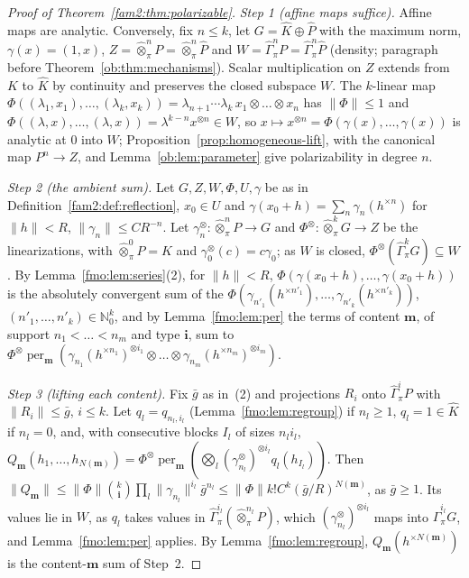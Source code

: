 \documentclass[11pt]{amsart}
\theoremstyle{definition}
\theoremstyle{remark}
\numberwithin{equation}{section}
\newcommand{\N}{\mathbb N}
\newcommand{\norm}[1]{\lVert #1\rVert}
\newcommand{\Kh}{\widehat K}
\theoremstyle{plain}
\theoremstyle{definition}
\theoremstyle{plain}
\newcommand{\hot}{\mathbin{\widehat\otimes}}
\newcommand{\hGamma}{\widehat\Gamma}
\begin{document}
\begin{proof}[Proof of Theorem~\ref{fam2:thm:polarizable}]
\emph{Step 1 (affine maps suffice).} Affine maps are analytic. Conversely, fix $n\le k$, let $G=\Kh\oplus\widehat P$ with
the maximum norm, $\gamma(x)=(1,x)$, $Z=\hot^n_\pi P=\hot^n_\pi\widehat P$ and $W=\hGamma^n_\pi P=\hGamma^n_\pi\widehat P$
(density; paragraph before Theorem~\ref{ob:thm:mechanisms}). Scalar multiplication on $Z$ extends from $K$ to $\Kh$
by continuity and preserves the closed subspace $W$. The $k$-linear map $\Phi((\lambda_1,x_1),\dots,(\lambda_k,x_k))=
\lambda_{n+1}\cdots\lambda_k\,x_1\otimes\dots\otimes x_n$ has $\norm\Phi\le1$ and $\Phi((\lambda,x),\dots,(\lambda,x))=
\lambda^{k-n}x^{\otimes n}\in W$, so
$x\mapsto x^{\otimes n}=\Phi(\gamma(x),\dots,\gamma(x))$ is analytic at $0$ into $W$; Proposition~\ref{prop:homogeneous-lift},
with the canonical map $P^n\to Z$, and Lemma~\ref{ob:lem:parameter} give polarizability in degree $n$.

\emph{Step 2 (the ambient sum).} Let $G,Z,W,\Phi,U,\gamma$ be as in Definition~\ref{fam2:def:reflection}, $x_0\in U$ and
$\gamma(x_0+h)=\sum_n\gamma_n(h^{\times n})$ for $\norm h<R$, $\norm{\gamma_n}\le CR^{-n}$. Let $\gamma^\otimes_n\colon
\hot^n_\pi P\to G$ and $\Phi^\otimes\colon\hot^k_\pi G\to Z$ be the linearizations, with $\hot^0_\pi P=\Kh$ and
$\gamma^\otimes_0(c)=c\gamma_0$; as $W$ is closed, $\Phi^\otimes(\hGamma^k_\pi G)\subseteq W$. By
Lemma~\ref{fmo:lem:series}(2), for $\norm h<R$, $\Phi(\gamma(x_0+h),\dots,\gamma(x_0+h))$ is the absolutely convergent sum of
the $\Phi(\gamma_{n'_1}(h^{\times n'_1}),\dots,\gamma_{n'_k}(h^{\times n'_k}))$, $(n'_1,\dots,n'_k)\in\N_0^k$, and by
Lemma~\ref{fmo:lem:per} the terms of content $\mathbf m$, of support $n_1<\dots<n_m$ and type $\mathbf i$, sum to
$\Phi^\otimes\operatorname{per}_{\mathbf m}(\gamma_{n_1}(h^{\times n_1})^{\otimes i_1}\otimes\dots\otimes
\gamma_{n_m}(h^{\times n_m})^{\otimes i_m})$.

\emph{Step 3 (lifting each content).} Fix $\bar g$ as in~(2) and projections $R_i$ onto $\hGamma^i_\pi P$ with
$\norm{R_i}\le\bar g$, $i\le k$. Let $q_l=q_{n_l,i_l}$ (Lemma~\ref{fmo:lem:regroup}) if $n_l\ge1$, $q_l=1\in\Kh$ if $n_l=0$,
and, with consecutive blocks $I_l$ of sizes $n_li_l$, $Q_{\mathbf m}(h_1,\dots,h_{N(\mathbf m)})=\Phi^\otimes
\operatorname{per}_{\mathbf m}(\bigotimes_l(\gamma^\otimes_{n_l})^{\otimes i_l}q_l(h_{I_l}))$. Then $\norm{Q_{\mathbf m}}\le
\norm\Phi\binom k{\mathbf i}\prod_l\norm{\gamma_{n_l}}^{i_l}\bar g^{n_l}\le\norm\Phi k!C^k(\bar g/R)^{N(\mathbf m)}$, as
$\bar g\ge1$. Its values lie in $W$, as $q_l$ takes values in $\hGamma^{i_l}_\pi(\hot^{n_l}_\pi P)$, which
$(\gamma^\otimes_{n_l})^{\otimes i_l}$ maps into $\hGamma^{i_l}_\pi G$, and Lemma~\ref{fmo:lem:per} applies. By
Lemma~\ref{fmo:lem:regroup}, $Q_{\mathbf m}(h^{\times N(\mathbf m)})$ is the content-$\mathbf m$ sum of Step~2.


\end{proof}
\end{document}

